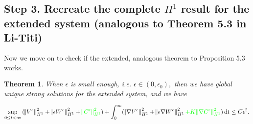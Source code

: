 \documentclass[11pt]{article}
\newtheorem{theorem}{Theorem}
\newcommand*\diff{\mathop{}\!\mathrm{d}}
\begin{document}
\subsection{Step 3. Recreate the complete $H^1$ result for the extended system (analogous to Theorem 5.3 in Li-Titi)}

Now we move on to check if the extended, analogous theorem to Proposition 5.3 works.

\begin{theorem}
When $\epsilon$ is small enough, i.e. $\epsilon \in (0, \epsilon_0),$ then we have global unique strong solutions for the extended system, and we have

$$ \sup_{0 \leq t < \infty}{(\norm{V^\epsilon}^2_{H^1} + \norm{\epsilon W^\epsilon}^2_{H^1} + \textcolor{green}{\norm{C^\epsilon}^2_{H^1}}) } + \int_0^\infty (\norm{\nabla V^\epsilon}^2_{H^1} + \norm{\epsilon \nabla W^\epsilon}^2_{H^1} \textcolor{green}{+ K \norm{\nabla C^\epsilon}^2_{H^1}}) \diff t \leq C \epsilon^2. $$

\end{theorem}
\end{document}
